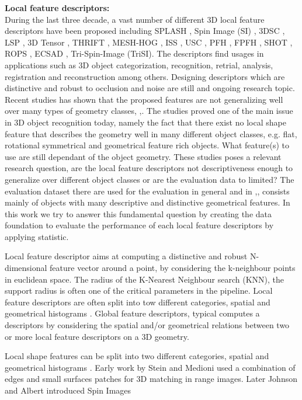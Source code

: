 \documentclass[10pt,twocolumn,letterpaper]{article}
\begin{document}
\textbf{Local feature descriptors:}\\
During the last three decade, a vast number of different 3D local feature descriptors have been proposed including SPLASH \cite{Stein1992}, Spin Image (SI) \cite{Johnson1999}, 3DSC \cite{Frome2004}, LSP \cite{ChenBhanu2004}, 3D Tensor \cite{Mian2006}, THRIFT \cite{Flint2007}, MESH-HOG \cite{Zaharescu2009}, ISS \cite{Zhong2009}, USC \cite{usc2010}, PFH \cite{Rusu2008}, FPFH \cite{Fpfh2009}, SHOT \cite{Tombari2010}, ROPS \cite{Guo2013}, ECSAD \cite{Ecsad2015}, Tri-Spin-Image (TriSI)\cite{Guo2015}. The descriptors find usages in applications such as 3D object categorization, recognition, retrial, analysis, registration and reconstruction among others. Designing descriptors which are distinctive and robust to occlusion and noise are still and ongoing research topic. Recent studies has shown that the proposed features are not generalizing well over many types of geometry classes, \cite{Guo2015},\cite{Buch2016}. The studies proved one of the main issue in 3D object recognition today, namely the fact that there exist no local shape feature that describes the geometry well in many different object classes, e.g. flat, rotational symmetrical and geometrical feature rich objects. What feature(s) to use are still dependant of the object geometry. These studies poses a relevant research question, are the local feature descriptors not descriptiveness enough to generalize over different object classes or are the evaluation data to limited? The evaluation dataset there are used for the evaluation in general and in \cite{Guo2015},\cite{Buch2016}, consists mainly of objects with many descriptive and distinctive geometrical features. In this work we try to answer this fundamental question by creating the data foundation to evaluate the performance of each local feature descriptors by applying statistic. 

Local feature descriptor aims at computing a distinctive and robust N-dimensional feature vector around a point, by considering the k-neighbour points in euclidean space. The radius of the K-Nearest Neighbour search (KNN), the support radius is often one of the critical parameters in the pipeline. Local feature descriptors are often split into tow different categories, spatial and geometrical histograms \cite{Guo2015}. Global feature descriptors, typical computes a descriptors by considering the spatial and/or geometrical relations between two or more local feature descriptors on a 3D geometry.   

Local shape features can be split into two different categories, spatial and geometrical histograms \cite{Guo2015}. 
Early work by Stein and Medioni \cite{Stein1992} used a combination of edges and small surfaces patches for 3D matching in range images. Later Johnson  and Albert introduced Spin Images \cite{Johnson1999} 
\end{document}
